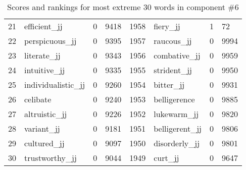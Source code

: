 \begin{table}[tbp]
\begin{tabular}{| rlr@{.}l | rlr@{.}l |}
    21 & efficient\_jj & 0 & 9418    &    1958 & fiery\_jj & 1 & 72 \\
    22 & perspicuous\_jj & 0 & 9395    &    1957 & raucous\_jj & 0 & 9994 \\
    23 & literate\_jj & 0 & 9343    &    1956 & combative\_jj & 0 & 9959 \\
    24 & intuitive\_jj & 0 & 9335    &    1955 & strident\_jj & 0 & 9950 \\
    25 & individualistic\_jj & 0 & 9260    &    1954 & bitter\_jj & 0 & 9931 \\
    26 & celibate & 0 & 9240    &    1953 & belligerence & 0 & 9885 \\
    27 & altruistic\_jj & 0 & 9226    &    1952 & lukewarm\_jj & 0 & 9820 \\
    28 & variant\_jj & 0 & 9181    &    1951 & belligerent\_jj & 0 & 9806 \\
    29 & cultured\_jj & 0 & 9097    &    1950 & disorderly\_jj & 0 & 9801 \\
    30 & trustworthy\_jj & 0 & 9044    &    1949 & curt\_jj & 0 & 9647 \\
    \hline
    \end{tabular}
    \caption{Scores and rankings for most extreme 30 words in component \#6} 
\end{table}
\clearpage
